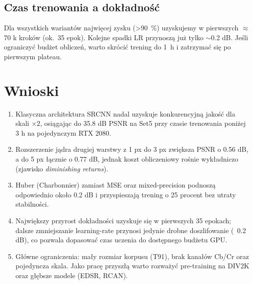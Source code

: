 \documentclass[11pt]{article}
\begin{document}
\subsection{Czas trenowania a dokładność}

Dla wszystkich wariantów najwięcej zysku (>\SI{90}{\percent})
uzyskujemy w pierwszych \(\approx\)70 k kroków
(ok.~35 epok).  Kolejne spadki LR przynoszą już tylko
\(\sim\)0.2 dB.  Jeśli ograniczyć budżet obliczeń,
warto skrócić trening do \SI{1}{h} i zatrzymać się
po pierwszym plateau.


\section{Wnioski}
\label{sec:conclusion}

\begin{enumerate}
  \item Klasyczna architektura SRCNN nadal uzyskuje konkurencyjną
        jakość dla skali ×2, osiągając do 35.8 dB PSNR na Set5
        przy czasie trenowania poniżej 3 h na pojedynczym RTX 2080.
  \item Rozszerzenie jądra drugiej warstwy z 1 px do 3 px
        zwiększa PSNR o 0.56 dB, a do 5 px łącznie o 0.77 dB,
        jednak koszt obliczeniowy rośnie wykładniczo
        (zjawisko \emph{diminishing returns}).
  \item Huber (Charbonnier) zamiast MSE oraz mixed-precision
        podnoszą odpowiednio około 0.2 dB i przyspieszają
        trening o 25 procent bez utraty stabilności.
  \item Największy przyrost dokładności uzyskuje się w pierwszych
        35 epokach; dalsze zmniejszanie learning-rate przynosi
        jedynie drobne doszlifowanie (~0.2 dB), co pozwala
        dopasować czas uczenia do dostępnego budżetu GPU.
  \item Główne ograniczenia: mały rozmiar korpusu (T91),
        brak kanałów Cb/Cr oraz pojedyncza skala.  Jako
        pracę przyszłą warto rozważyć pre-training na DIV2K
        oraz głębsze modele (EDSR, RCAN).
\end{enumerate}
\end{document}
